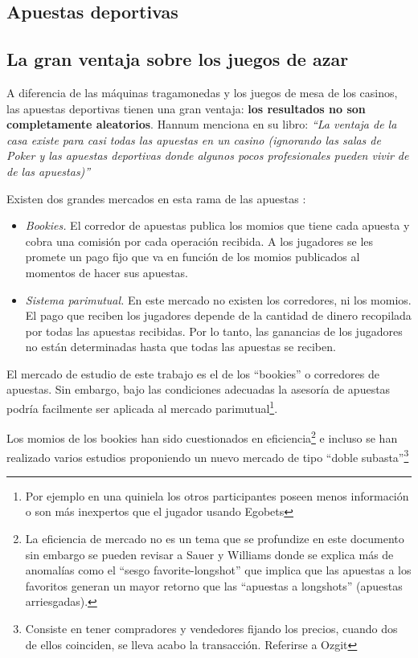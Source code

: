\subsection{Apuestas deportivas}

\subsection{La gran ventaja sobre los juegos de azar}

A diferencia de las máquinas tragamonedas y los juegos de mesa de los casinos, las apuestas deportivas tienen una gran ventaja: \textbf{los resultados no son completamente aleatorios}. Hannum menciona en su libro: \emph{``La ventaja de la casa existe para casi todas las apuestas en un casino (ignorando las salas de Poker y las apuestas deportivas donde algunos pocos profesionales pueden vivir de de las apuestas)''} \cite{hannum2005practical} 

Existen dos grandes mercados en esta rama de las apuestas \cite{chung2010empirical}:
\begin{itemize} 
	\item \emph{Bookies.} El corredor de apuestas publica los momios que tiene cada apuesta y cobra una comisión por cada operación recibida. A los jugadores se les promete un pago fijo que va en función de los momios publicados al momentos de hacer sus apuestas.
	\item \emph{Sistema parimutual.} En este mercado no existen los corredores, ni los momios. El pago que reciben los jugadores depende de la cantidad de dinero recopilada por todas las apuestas recibidas. Por lo tanto, las ganancias de los jugadores no están determinadas hasta que todas las apuestas se reciben.
	\end{itemize}

El mercado de estudio de este trabajo es el de los ``bookies'' o corredores de apuestas. Sin embargo, bajo las condiciones adecuadas la asesoría de apuestas podría facilmente ser aplicada al mercado parimutual\footnote{Por ejemplo en una quiniela los otros participantes poseen menos información o son más inexpertos que el jugador usando Egobets}.

Los momios de los bookies han sido cuestionados en eficiencia\footnote{La eficiencia de mercado no es un tema que se profundize en este documento sin embargo se pueden revisar a Sauer \cite{sauer1998economics} y Williams \cite{williams1999information} donde se explica más de anomalías como el ``sesgo favorite-longshot'' que implica que las apuestas a los favoritos generan un mayor retorno que las ``apuestas a longshots'' (apuestas arriesgadas).  } e incluso se han realizado varios estudios proponiendo un nuevo mercado de tipo ``doble subasta''\footnote{Consiste en tener compradores y vendedores fijando los precios, cuando dos de ellos coinciden, se lleva acabo la transacción. Referirse a Ozgit\cite{ozgit2005posted} }

